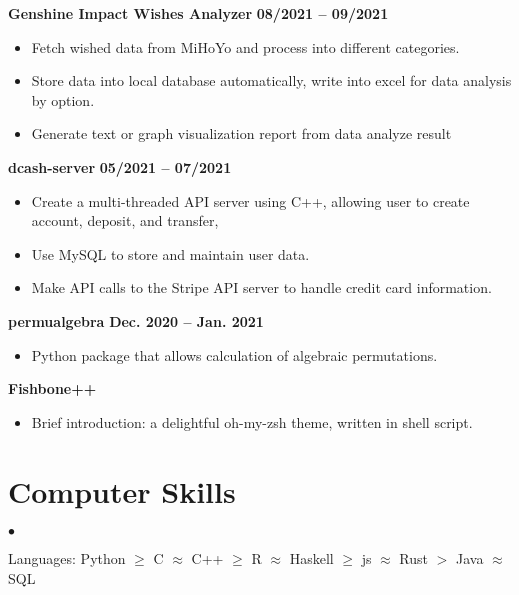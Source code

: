 \documentclass[margin,line]{res}
\newenvironment{list2}{
  \begin{list}{$\bullet$}{%
      \setlength{\itemsep}{0in}
      \setlength{\parsep}{0in} \setlength{\parskip}{0in}
      \setlength{\topsep}{0in} \setlength{\partopsep}{0in} 
      \setlength{\leftmargin}{0.2in}}}{\end{list}}
\begin{document}
\begin{resume}
{\bf Genshine Impact Wishes Analyzer} \hfill {\bf 08/2021 -- 09/2021} \\
\begin{itemize}
	\item Fetch wished data from MiHoYo and process into different categories.
	\item Store data into local database automatically, write into excel for data analysis by option.
	\item Generate text or graph visualization report from data analyze result
\end{itemize}
\vspace{-.3cm}

{\bf dcash-server} \hfill {\bf 05/2021 -- 07/2021} \\
\begin{itemize}
	\item Create a multi-threaded API server using C++, allowing user to create account, deposit, and transfer,
	\item Use MySQL to store and maintain user data.
	\item Make API calls to the Stripe API server to handle credit card information.
\end{itemize}
\vspace{-.3cm}


{\bf permualgebra} \hfill {\bf Dec. 2020 -- Jan. 2021} \\
\begin{itemize}
  \item Python package that allows calculation of algebraic permutations.
\end{itemize}
\vspace{-.3cm}

{\bf Fishbone++} \\
\begin{itemize}
  \item Brief introduction: a delightful oh-my-zsh theme, written in shell script.
\end{itemize}



\section{\sc Computer Skills} 
\begin{list2}
\item Languages: Python $\geq$ C $\approx$ C++ $\geq$ R $\approx$ Haskell $\geq$ js $\approx$ Rust $>$ Java $\approx$ SQL
\end{list2}



\end{resume}
\end{document}
